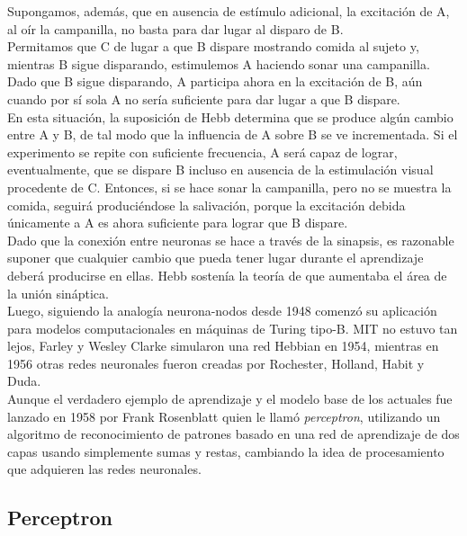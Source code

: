 \documentclass{llncs}
\begin{document}
\begin{multicols}{2}[]
Supongamos, adem\'as, que en ausencia de est\'imulo adicional, la excitaci\'on de A, al o\'ir la campanilla, no basta para dar lugar al
disparo de B.\\

Permitamos que C de lugar a que B dispare mostrando comida al sujeto y, mientras B sigue disparando, estimulemos A haciendo
sonar una campanilla. Dado que B sigue disparando, A participa ahora en la excitaci\'on de B, a\'un cuando por s\'i sola A no ser\'ia
suficiente para dar lugar a que B dispare.\\

En esta situaci\'on, la suposici\'on de Hebb determina que se produce alg\'un cambio entre A y B, de tal modo que la influencia de A
sobre B se ve incrementada. Si el experimento se repite con suficiente frecuencia, A ser\'a capaz de lograr, eventualmente, que se
dispare B incluso en ausencia de la estimulaci\'on visual procedente de C. Entonces, si se hace sonar la campanilla, pero no se muestra
la comida, seguir\'a produci\'endose la salivaci\'on, porque la excitaci\'on debida \'unicamente a A es ahora suficiente para lograr que
B dispare.\\

Dado que la conexi\'on entre neuronas se hace a trav\'es de la sinapsis, es razonable suponer que cualquier cambio que pueda tener
lugar durante el aprendizaje deber\'a producirse en ellas. Hebb sosten\'ia la teor\'ia de que aumentaba el \'area de la uni\'on sin\'aptica.\\

Luego, siguiendo la analog\'ia neurona-nodos desde 1948 comenz\'o su aplicaci\'on para modelos
computacionales en m\'aquinas de Turing tipo-B. MIT no estuvo tan lejos, Farley y Wesley Clarke simularon una red Hebbian en 1954,
mientras en 1956 otras redes neuronales fueron creadas por Rochester, Holland, Habit y Duda. \\

Aunque el verdadero ejemplo de aprendizaje y el modelo base de los actuales fue lanzado en 1958 por Frank Rosenblatt quien le llam\'o
\textit{perceptron}, utilizando un algoritmo de reconocimiento de patrones basado en una red de aprendizaje de dos capas usando
simplemente sumas y restas, cambiando la idea de procesamiento que adquieren las redes neuronales.

\subsection{Perceptron}


\end{multicols}
\end{document}
